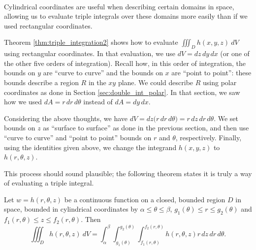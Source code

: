 \\


Cylindrical coordinates are useful when describing certain domains in space, allowing us to evaluate triple integrals over these domains more easily than if we used rectangular coordinates.

Theorem \ref{thm:triple_integration2} shows how to evaluate $\iiint_Dh(x,y,z)\ dV$ using rectangular coordinates. In that evaluation, we use $dV = dz\,dy\,dx$ (or one of the other five orders of integration). Recall how, in this order of integration, the bounds on $y$ are ``curve to curve'' and the bounds on $x$ are ``point to point'': these bounds describe a region $R$ in the $xy$ plane. We could describe $R$ using polar coordinates as done in Section \ref{sec:double_int_polar}. In that section, we saw how we used $dA = r\,dr\,d\theta$ instead of $dA = dy\,dx$. 

Considering the above thoughts, we have $dV = dz\big(r\,dr\,d\theta\big) = r\,dz\,dr\,d\theta$. We set bounds on $z$ as ``surface to surface'' as done in the previous section, and then use ``curve to curve'' and ``point to point'' bounds on $r$ and $\theta$, respectively. Finally, using the identities given above, we change the integrand $h(x,y,z)$ to $h(r,\theta,z)$.

This process should sound plausible; the following theorem states it is truly a way of evaluating a triple integral.

{%
Let $w=h(r,\theta,z)$ be a continuous function on a closed, bounded region $D$ in space, bounded in cylindrical coordinates by $\alpha \leq \theta \leq \beta$, $g_1(\theta)\leq r \leq g_2(\theta)$ and $f_1(r,\theta) \leq z \leq f_2(r,\theta)$. Then  
$$\iiint_D h(r,\theta,z)\ dV = \int_\alpha^\beta\int_{g_1(\theta)}^{g_2(\theta)}\int_{f_1(r,\theta)}^{f_2(r,\theta)}h(r,\theta,z) r\,dz\,dr\,d\theta.$$
}

